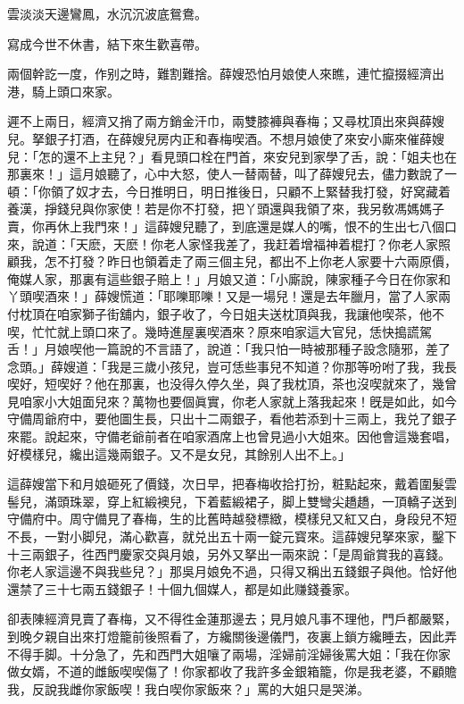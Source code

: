 \begin{myquote}
雲淡淡天邊鸞鳳，水沉沉波底鴛鴦。

寫成今世不休書，結下來生歡喜帶。
\end{myquote}

兩個幹訖一度，作别之時，難割難捨。薛嫂恐怕月娘使人來瞧，連忙攛掇經濟出港，騎上頭口來家。

遲不上兩日，經濟又捎了兩方銷金汗巾，兩雙膝褲與春梅；又尋枕頂出來與薛嫂兒。拏銀子打酒，在薛嫂兒房内正和春梅喫酒。不想月娘使了來安小廝來催薛嫂兒：「怎的還不上主兒？」看見頭口栓在門首，來安兒到家學了舌，說：「姐夫也在那裏來！」這月娘聽了，心中大怒，使人一替兩替，叫了薛嫂兒去，儘力數說了一頓：「你領了奴才去，今日推明日，明日推後日，只顧不上緊替我打發，好窝藏着養漢，掙錢兒與你家使！若是你不打發，把丫頭還與我領了來，我另敎馮媽媽子賣，你再休上我門來！」這薛嫂兒聽了，到底還是媒人的嘴，恨不的生出七八個口來，說道：「天麽，天麽！你老人家怪我差了，我赶着增福神着棍打？你老人家照顧我，怎不打發？昨日也領着走了兩三個主兒，都出不上你老人家要十六兩原價，俺媒人家，那裏有這些銀子賠上！」月娘又道：「小廝說，陳家種子今日在你家和丫頭喫酒來！」薛嫂慌道：「耶嚛耶嚛！又是一場兒！還是去年臘月，當了人家兩付枕頂在咱家獅子街舖内，銀子收了，今日姐夫送枕頂與我，我讓他喫茶，他不喫，忙忙就上頭口來了。幾時進屋裏喫酒來？原來咱家這大官兒，恁快搗謊駕舌！」月娘喫他一篇說的不言語了，說道：「我只怕一時被那種子設念隨邪，差了念頭。」薛嫂道：「我是三歲小孩兒，豈可恁些事兒不知道？你那等吩咐了我，我長喫好，短喫好？他在那裏，也没得久停久坐，與了我枕頂，茶也沒喫就來了，幾曾見咱家小大姐面兒來？萬物也要個眞實，你老人家就上落我起來！旣是如此，如今守備周爺府中，要他圖生長，只出十二兩銀子，看他若添到十三兩上，我兑了銀子來罷。說起來，守備老爺前者在咱家酒席上也曾見過小大姐來。因他會這幾套唱，好模樣兒，纔出這幾兩銀子。又不是女兒，其餘别人出不上。」

這薛嫂當下和月娘砸死了價錢，次日早，把春梅收拾打扮，粧點起來，戴着圍髮雲髻兒，滿頭珠翠，穿上紅緞襖兒，下着藍緞裙子，脚上雙彎尖趫趫，一頂轎子送到守備府中。周守備見了春梅，生的比舊時越發標緻，模樣兒又紅又白，身段兒不短不長，一對小脚兒，滿心歡喜，就兑出五十兩一錠元寳來。這薛嫂兒拏來家，鑿下十三兩銀子，徃西門慶家交與月娘，另外又拏出一兩來說：「是周爺賞我的喜錢。你老人家這邊不與我些兒？」那吳月娘免不過，只得又稱出五錢銀子與他。恰好他還禁了三十七兩五錢銀子！十個九個媒人，都是如此赚錢養家。

卻表陳經濟見賣了春梅，又不得徃金蓮那邊去；見月娘凡事不理他，門戶都嚴緊，到晚夕親自出來打燈籠前後照看了，方纔關後邊儀門，夜裏上鎖方纔睡去，因此弄不得手脚。十分急了，先和西門大姐嚷了兩場，淫婦前淫婦後罵大姐：「我在你家做女婿，不道的雌飯喫喫傷了！你家都收了我許多金銀箱籠，你是我老婆，不顧贍我，反說我雌你家飯喫！我白喫你家飯來？」罵的大姐只是哭涕。

